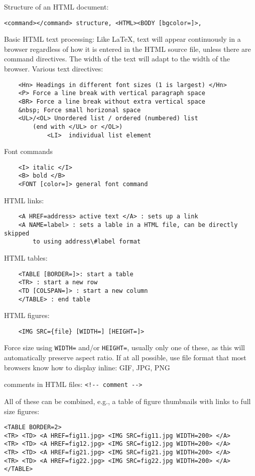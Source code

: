 \documentclass{article}
\begin{document}
Structure of an HTML document:
\begin{verbatim}
<command></command> structure, <HTML><BODY [bgcolor=]>,
\end{verbatim}

Basic HTML text processing: Like LaTeX, text will appear continuously in a browser
regardless of how it is entered in the HTML source file, unless there
are command directives. The width of the text will adapt to the width
of the browser. Various text directives:
\begin{verbatim}
    <Hn> Headings in different font sizes (1 is largest) </Hn>
    <P> Force a line break with vertical paragraph space
    <BR> Force a line break without extra vertical space
    &nbsp; Force small horizonal space
    <UL>/<OL> Unordered list / ordered (numbered) list
        (end with </UL> or </OL>)
            <LI>  individual list element
\end{verbatim}
Font commands
\begin{verbatim}
    <I> italic </I>
    <B> bold </B>
    <FONT [color=]> general font command
\end{verbatim}

HTML links:
\begin{verbatim}
    <A HREF=address> active text </A> : sets up a link
    <A NAME=label> : sets a lable in a HTML file, can be directly skipped
        to using address\#label format
\end{verbatim}

HTML tables:
\begin{verbatim}
    <TABLE [BORDER=]>: start a table
    <TR> : start a new row
    <TD [COLSPAN=]> : start a new column
    </TABLE> : end table
\end{verbatim}

HTML figures:
\begin{verbatim}
    <IMG SRC={file} [WIDTH=] [HEIGHT=]>
\end{verbatim}
Force size using \verb|WIDTH=| and/or \verb|HEIGHT=|, usually only one of these,
as this will automatically preserve aspect ratio.
If at all possible, use file format that most browsers know how to
display inline: GIF, JPG, PNG

comments in HTML files: \verb|<!-- comment -->|

All of these can be combined, e.g., a table of figure thumbnails with
links to full size figures:
\begin{verbatim}
<TABLE BORDER=2>
<TR> <TD> <A HREF=fig11.jpg> <IMG SRC=fig11.jpg WIDTH=200> </A>
<TR> <TD> <A HREF=fig12.jpg> <IMG SRC=fig12.jpg WIDTH=200> </A>
<TR> <TD> <A HREF=fig21.jpg> <IMG SRC=fig21.jpg WIDTH=200> </A>
<TR> <TD> <A HREF=fig22.jpg> <IMG SRC=fig22.jpg WIDTH=200> </A>
</TABLE>
\end{verbatim}
\end{document}
